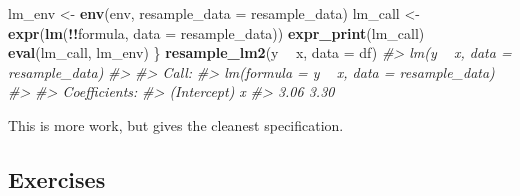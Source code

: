 \documentclass[]{book}
\newenvironment{Shaded}{\begin{snugshade}}{\end{snugshade}}
\newcommand{\CommentTok}[1]{\textcolor[rgb]{0.37,0.37,0.37}{\textit{#1}}}
\newcommand{\DataTypeTok}[1]{\textcolor[rgb]{0.27,0.27,0.27}{#1}}
\newcommand{\KeywordTok}[1]{\textcolor[rgb]{0.27,0.27,0.27}{\textbf{#1}}}
\newcommand{\NormalTok}[1]{#1}
\newcommand{\OperatorTok}[1]{\textcolor[rgb]{0.43,0.43,0.43}{\textbf{#1}}}
\newcommand{\StringTok}[1]{\textcolor[rgb]{0.5,0.5,0.5}{#1}}
\begin{document}
\begin{enumerate}
\begin{Shaded}
\begin{Highlighting}[]
\NormalTok{  lm_env <-}\StringTok{ }\KeywordTok{env}\NormalTok{(env, }\DataTypeTok{resample_data =}\NormalTok{ resample_data)}
\NormalTok{  lm_call <-}\StringTok{ }\KeywordTok{expr}\NormalTok{(}\KeywordTok{lm}\NormalTok{(}\OperatorTok{!!}\NormalTok{formula, }\DataTypeTok{data =}\NormalTok{ resample_data))}
  \KeywordTok{expr_print}\NormalTok{(lm_call)}
  \KeywordTok{eval}\NormalTok{(lm_call, lm_env)}
\NormalTok{\}}
\KeywordTok{resample_lm2}\NormalTok{(y }\OperatorTok{~}\StringTok{ }\NormalTok{x, }\DataTypeTok{data =}\NormalTok{ df)}
\CommentTok{#> lm(y ~ x, data = resample_data)}
\CommentTok{#> }
\CommentTok{#> Call:}
\CommentTok{#> lm(formula = y ~ x, data = resample_data)}
\CommentTok{#> }
\CommentTok{#> Coefficients:}
\CommentTok{#> (Intercept)            x  }
\CommentTok{#>        3.06         3.30}
\end{Highlighting}
\end{Shaded}

  This is more work, but gives the cleanest specification.
\end{enumerate}

\hypertarget{exercises-13}{%
\subsection{Exercises}\label{exercises-13}}
\end{document}
